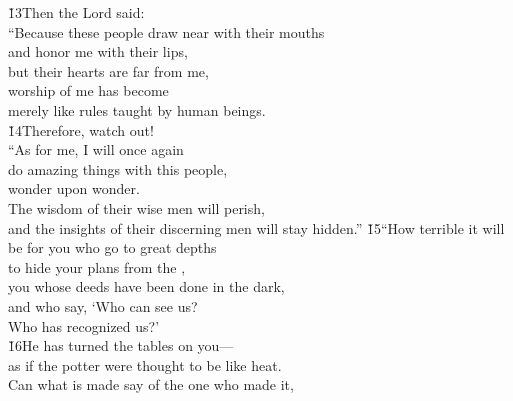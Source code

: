 \begin{poetry}
\poeml \v{13}Then the Lord said: \\
\poeml ``Because these people draw near with their mouths \\
\poemll    and honor me with their lips, \\
\poemlll       but their hearts are far from me, \\
\poeml worship of me has become \\
\poemll    merely like rules taught by human beings. \\
\poeml \v{14}Therefore, watch out! \\
\poeml ``As for me, I will once again \\
\poemll    do amazing things with this people, \\
\poemlll       wonder upon wonder. \\
\poeml The wisdom of their wise men will perish, \\
\poemll    and the insights of their discerning men will stay hidden.''
\poeml \v{15}``How terrible it will be for you who go to great depths \\
\poemll    to hide your plans from the , \\
\poeml you whose deeds have been done in the dark, \\
\poemll    and who say, `Who can see us? \\
\poemlll       Who has recognized us?' \\
\poeml \v{16}He has turned the tables on you--- \\
\poemll    as if the potter were thought to be like heat. \\
\poeml Can what is made say of the one who made it, \\

\end{poetry}

